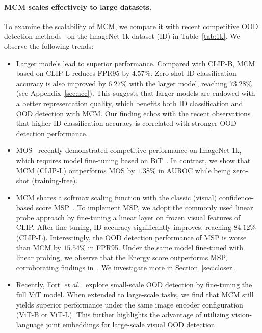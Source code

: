 \documentclass{article}
\def\etal{\emph{et al.}}
\begin{document}
\paragraph{MCM scales effectively to large datasets.} To examine the scalability of MCM, we compare it with recent competitive OOD detection methods~\cite{fort2021exploring,huang2021mos} on the ImageNet-1k dataset (ID) in Table~\ref{tab:1k}.
We observe the following trends: 
\begin{itemize}[leftmargin=*,topsep=4pt,itemsep=4pt,parsep=0pt]
    \item Larger models lead to superior performance. Compared with CLIP-B, MCM based on CLIP-L reduces FPR95 by $4.57\%$. Zero-shot ID classification accuracy is also improved by $6.27\%$ with the larger model, reaching $73.28\%$ (see Appendix~\ref{sec:acc}).  This suggests that larger models are endowed with a better representation quality, which benefits both ID classification and OOD detection with MCM. Our finding echos with the recent observations~\cite{vaze2021open} that higher ID classification accuracy is correlated with stronger OOD detection performance.
    \item  MOS~\cite{huang2021mos} recently demonstrated competitive performance on ImageNet-1k, which requires model fine-tuning based on BiT~\cite{kolesnikov2020big}. In contrast, we show that MCM (CLIP-L) outperforms MOS by $1.38\%$ in AUROC while being zero-shot (training-free).
    \item MCM shares a softmax scaling function with the classic (visual) confidence-based score MSP~\cite{hendrycks2016baseline}. To implement MSP, we adopt the commonly used linear probe approach by fine-tuning a linear layer on frozen visual features of CLIP. After fine-tuning, ID accuracy significantly improves, reaching $84.12\%$ (CLIP-L). Interestingly, the OOD detection performance of MSP is worse than MCM by $15.54\%$ in FPR95. Under the same model fine-tuned with linear probing, we observe that the Energy score outperforms MSP, corroborating findings in~\cite{liu2020energy}. We investigate more in Section~\ref{sec:closer}. 
    \item Recently,  Fort~\etal~\cite{fort2021exploring} explore small-scale OOD detection by fine-tuning the full ViT model. When extended to large-scale tasks, we find that MCM still yields superior performance under the same image encoder configuration (ViT-B or ViT-L). This further highlights the advantage of utilizing vision-language joint embeddings for large-scale visual OOD detection.
\end{itemize}
\end{document}

